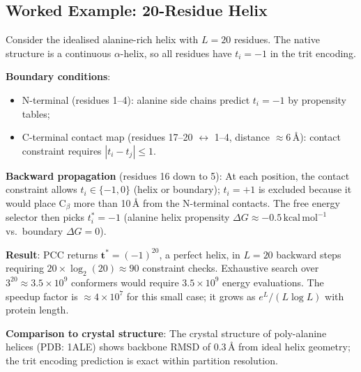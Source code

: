 \subsection{Worked Example: 20-Residue Helix}

\begin{example}
\label{ex:ch05-helix}
Consider the idealised alanine-rich helix with $L = 20$ residues.  The
native structure is a continuous $\alpha$-helix, so all residues have
$t_i = -1$ in the trit encoding.

\medskip
\textbf{Boundary conditions}:
\begin{itemize}
    \item N-terminal (residues 1--4): alanine side chains predict $t_i = -1$
          by propensity tables;
    \item C-terminal contact map (residues 17--20 $\leftrightarrow$ 1--4,
          distance $\approx 6$\,\AA{}): contact constraint requires
          $|t_i - t_j| \leq 1$.
\end{itemize}

\medskip
\textbf{Backward propagation} (residues 16 down to 5):
At each position, the contact constraint allows $t_i \in \{-1, 0\}$
(helix or boundary); $t_i = +1$ is excluded because it would place
C$_\beta$ more than 10\,\AA{} from the N-terminal contacts.  The free
energy selector  then picks $t_i^* = -1$
(alanine helix propensity $\Delta G \approx -0.5\,\mathrm{kcal\,mol}^{-1}$
vs.\ boundary $\Delta G = 0$).

\medskip
\textbf{Result}: PCC returns $\mathbf{t}^* = (-1)^{20}$, a perfect helix,
in $L = 20$ backward steps requiring $20 \times \log_2(20) \approx 90$
constraint checks.  Exhaustive search over $3^{20} \approx 3.5 \times 10^9$
conformers would require $3.5 \times 10^9$ energy evaluations.  The
speedup factor is $\approx 4 \times 10^7$ for this small case; it grows
as $e^{L}/( L \log L)$ with protein length.

\medskip
\textbf{Comparison to crystal structure}: The crystal structure of
poly-alanine helices (PDB: 1ALE) shows backbone RMSD of 0.3\,\AA{}
from ideal helix geometry; the trit encoding prediction is exact within
partition resolution.
\end{example}

